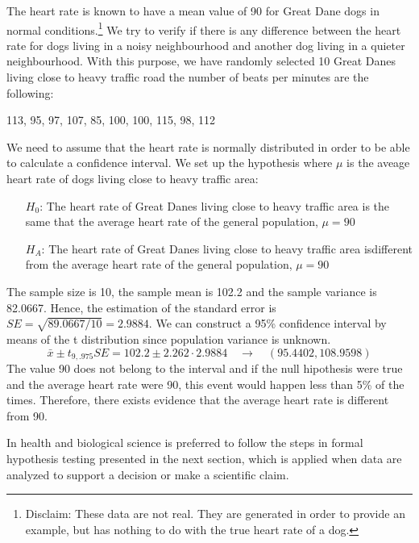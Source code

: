  \begin{examplewrap}
 \begin{nexample}{The heart rate   is known to
 have a mean value of   90 for  Great Dane dogs in normal conditions.\footnote{Disclaim: These data are not real. They are generated in order to provide an example, but has nothing to do with the true heart rate of a dog.} We try to verify if there is any difference between the heart rate for dogs living in a noisy neighbourhood and another dog living in a quieter neighbourhood.  With this purpose, we have randomly selected  10 Great Danes living close to heavy traffic road the  
 number of beats per minutes are the following:
 \begin{center}
   113, 95, 97, 107, 85, 100, 100, 115, 98, 112 
 \end{center}} 
\label{ex:GreatDanesCI}

 We need to assume that the heart rate is normally distributed in order to be able to calculate a confidence interval.  
 We set up the hypothesis where $\mu$ is the aveage heart rate of dogs living close to heavy traffic area: 
 \begin{itemize}
 \item[$H_0$:] The heart rate of Great Danes living close to heavy traffic area is the same that the average heart rate of the general population, $\mu=90$ 
 \item[$H_A$:] The heart rate of Great Danes living close to heavy traffic area isdifferent from the average heart rate of the general population, $\mu=90$ 
 \end{itemize}

   The sample size is 10, the sample mean is 102.2 and the sample variance is 82.0667. Hence, the estimation of the standard error is $SE=\sqrt{89.0667/10}=2.9884$. We can construct a 95\% confidence interval by means of the t distribution since population variance is unknown.    
 $$\bar{x}\pm t_{9,.975}SE=102.2\pm2.262 \cdot 2.9884 \quad \to \quad (95.4402,108.9598)$$
 The value 90 does not belong to the interval and if the null hipothesis were true and the average heart rate were 90, this event would happen less than 5\% of the times. Therefore, there exists evidence that the average heart rate is different from 90. 

 \end{nexample}
 \end{examplewrap}
In health and biological science is preferred to follow  the steps in formal hypothesis testing presented in the next section, which is applied when data are analyzed to support a decision or make a scientific claim.


